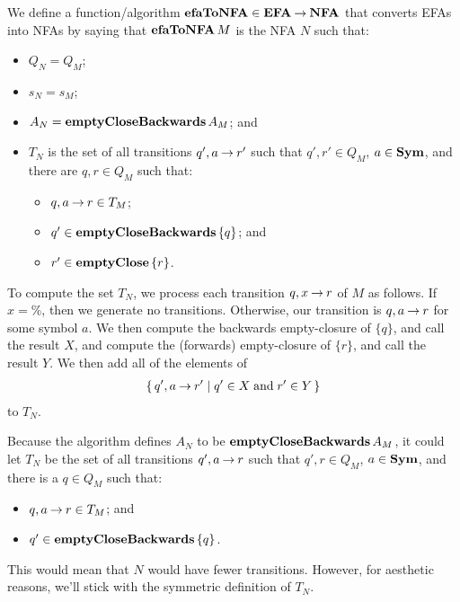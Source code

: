 We define a function/algorithm $\mathbf{efaToNFA}\in\mathbf{EFA}\mathbin{\to}\mathbf{NFA}$ that
%
%
converts EFAs into NFAs by saying that $\mathbf{efaToNFA}\,M$ is the NFA $N$
such that:
\begin{itemize}
\item $Q_N=Q_M$;

\item $s_N=s_M$;

\item $A_N=\mathbf{emptyCloseBackwards}\,A_M$; and

\item $T_N$ is the set of all transitions $q', a\mathbin{\to} r'$ such that
  $q',r'\in Q_M$, $a\in\mathbf{Sym}$, and there are $q,r\in Q_M$ such that:
\begin{itemize}
\item $q,a\mathbin{\to} r\in T_M$;
\item $q'\in{\mathbf{emptyCloseBackwards}\,\{q\}}$; and
\item $r'\in{\mathbf{emptyClose}\,\{r\}}$.
\end{itemize}
\end{itemize}

To compute the set $T_N$, we process each transition $q,x\mathbin{\to} r$ of
$M$ as follows.  If $x=\%$, then we generate no transitions.
Otherwise, our transition is $q, a\mathbin{\to} r$ for some symbol $a$.  We
then compute the backwards empty-closure of $\{q\}$, and call the
result $X$, and compute the (forwards) empty-closure of $\{r\}$, and
call the result $Y$.  We then add all of the elements of
\begin{gather*}
\{ \, q', a\mathbin{\to} r' \mid q'\in X\;\allowbreak\mbox{and}\allowbreak\;r'\in Y \, \}
\end{gather*}
to $T_N$.

Because the algorithm defines $A_N$ to be $\mathbf{emptyCloseBackwards}\,A_M$,
it could let $T_N$ be the set of all transitions $q',a\mathbin{\to} r$
such that $q',r\in Q_M$, $a\in\mathbf{Sym}$, and there is a $q\in Q_M$ such
that:
\begin{itemize}
\item $q,a\mathbin{\to} r\in T_M$; and
\item $q'\in{\mathbf{emptyCloseBackwards}\,\{q\}}$.
\end{itemize}
This would mean that $N$ would have fewer transitions.  However, for
aesthetic reasons, we'll stick with the symmetric definition of $T_N$.

